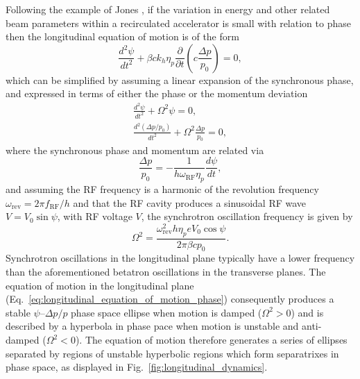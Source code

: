 \documentclass[../main.tex]{subfiles}
\begin{document}
Following the example of Jones \cite{jones2016design}, if the variation in energy and other related beam parameters within a recirculated accelerator is small with relation to phase then the longitudinal equation of motion is of the form 
\begin{equation}
\frac{d^{2}\psi}{dt^{2}} + \beta ck_{h}\eta_{p}\frac{\partial}{\partial t}\left(c\frac{\Delta p}{p_{0}}\right) = 0,
\label{eq:longitudinal_equation_of_motion}
\end{equation}
which can be simplified by assuming a linear expansion of the synchronous phase, and expressed in terms of either the phase or the momentum deviation
\begin{align}
\frac{d^{2}\psi}{dt^{2}} + \Omega^{2}\psi = 0,
\label{eq:longitudinal_equation_of_motion_phase} \\
\frac{d^{2}\left(\Delta p/p_{0}\right)}{dt^{2}} + \Omega^{2}\frac{\Delta p}{p_{0}} = 0,
\label{eq:longitudinal_equation_of_motion_momentum}
\end{align}
where the synchronous phase and momentum are related via
\begin{equation}
\frac{\Delta p}{p_{0}} = -\frac{1}{h\omega_{\mathrm{RF}}\eta_{p}}\frac{d\psi}{dt},
\label{eq:momentum_synchronous_phase_relation}    
\end{equation}
and assuming the RF frequency is a harmonic of the revolution frequency $\omega_{\mathrm{rev}}=2\pi f_{\mathrm{RF}}/h$ and that the RF cavity produces a sinusoidal RF wave $V=V_{0}\sin\psi$, with RF voltage $V$, the synchrotron oscillation frequency is given by
\begin{equation}
\Omega^{2} = \frac{\omega_{\mathrm{rev}}^{2}h\eta_{p}eV_{0}\cos\psi}{2\pi\beta cp_{0}}.
\label{eq:synchrotron_oscillation_frequency}    
\end{equation}
Synchrotron oscillations in the longitudinal plane typically have a lower frequency than the aforementioned betatron oscillations in the transverse planes. The equation of motion in the longitudinal plane (Eq.~\ref{eq:longitudinal_equation_of_motion_phase}) consequently produces a stable $\psi$--$\Delta p/p$ phase space ellipse when motion is damped ($\Omega^{2}>0$) and is described by a hyperbola in phase pace when motion is unstable and anti-damped ($\Omega^{2}<0$). The equation of motion therefore generates a series of ellipses separated by regions of unstable hyperbolic regions which form separatrixes in phase space, as displayed in Fig.~\ref{fig:longitudinal_dynamics}.
\end{document}
